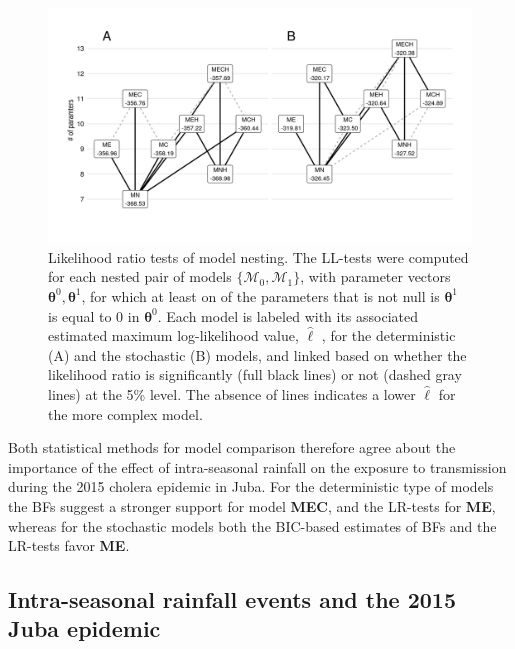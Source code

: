 \begin{figure}
    \centering
    \includegraphics[width = \textwidth, trim = 11mm 19mm 10mm 12mm, clip]{fig_cholera-rainfall/Lemaitre_ACTROP_2018_42_R1_fig3.png}
    \caption[Likelihood ratio tests of model nesting]{Likelihood ratio tests of model nesting. The LL-tests were computed for each nested pair of models $\{\mathcal{M}_0, \mathcal{M}_1\}$, with parameter vectors $\boldsymbol{\theta}^0,\boldsymbol{\theta}^1$, for which at least on of the parameters that is not null is $\boldsymbol{\theta}^1$ is equal to 0 in $\boldsymbol{\theta}^0$. Each model is labeled with its associated estimated maximum log-likelihood value, $\hat{\ell}$ , for the deterministic (A) and the stochastic (B) models, and linked based on whether the likelihood ratio is significantly (full black lines) or not (dashed gray lines) at the 5\% level. The absence of lines indicates a lower $\hat{\ell}$ for the more complex model.} 
    \label{fig:lltests}
\end{figure}

Both statistical methods for model comparison therefore agree about the importance of the effect of intra-seasonal rainfall on the exposure to transmission during the 2015 cholera epidemic in Juba. For the deterministic type of models the BFs suggest a stronger support for model \textbf{MEC}, and the LR-tests for \textbf{ME}, whereas for the stochastic models both the BIC-based estimates of BFs and the LR-tests favor \textbf{ME}. 

\subsection{Intra-seasonal rainfall events and the 2015 Juba epidemic}

